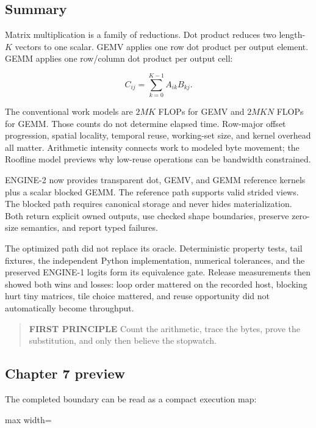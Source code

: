 \documentclass[
  10pt,
]{article}
\begin{document}
\subsection{Summary}\label{summary-5}

Matrix multiplication is a family of reductions. Dot product reduces two
length-\(K\) vectors to one scalar. GEMV applies one row dot product per
output element. GEMM applies one row/column dot product per output cell:

\[
C_{ij}=\sum_{k=0}^{K-1}A_{ik}B_{kj}.
\]

The conventional work models are \(2MK\) FLOPs for GEMV and \(2MKN\)
FLOPs for GEMM. Those counts do not determine elapsed time. Row-major
offset progression, spatial locality, temporal reuse, working-set size,
and kernel overhead all matter. Arithmetic intensity connects work to
modeled byte movement; the Roofline model previews why low-reuse
operations can be bandwidth constrained.

ENGINE-2 now provides transparent dot, GEMV, and GEMM reference kernels
plus a scalar blocked GEMM. The reference path supports valid strided
views. The blocked path requires canonical storage and never hides
materialization. Both return explicit owned outputs, use checked shape
boundaries, preserve zero-size semantics, and report typed failures.

The optimized path did not replace its oracle. Deterministic property
tests, tail fixtures, the independent Python implementation, numerical
tolerances, and the preserved ENGINE-1 logits form its equivalence gate.
Release measurements then showed both wins and losses: loop order
mattered on the recorded host, blocking hurt tiny matrices, tile choice
mattered, and reuse opportunity did not automatically become throughput.

\begin{quote}
\textbf{FIRST PRINCIPLE} Count the arithmetic, trace the bytes, prove
the substitution, and only then believe the stopwatch.
\end{quote}

\subsection{Chapter 7 preview}\label{chapter-7-preview}

The completed boundary can be read as a compact execution map:

\begin{center}\begin{adjustbox}{max width=\linewidth}\end{adjustbox}\end{center}
\end{document}

